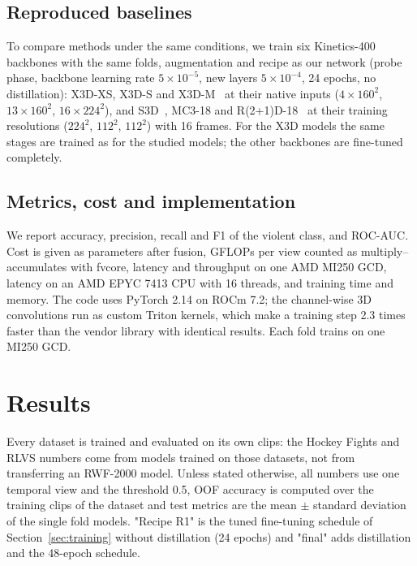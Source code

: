 \documentclass[conference]{IEEEtran}
\begin{document}
\subsection{Reproduced baselines}

To compare methods under the same conditions, we train six Kinetics-400
backbones with the same folds, augmentation and recipe as our network
(probe phase, backbone learning rate $5\times10^{-5}$, new layers
$5\times10^{-4}$, 24 epochs, no distillation): X3D-XS, X3D-S and
X3D-M~\cite{x3d} at their native inputs ($4\times160^2$, $13\times160^2$,
$16\times224^2$), and S3D~\cite{s3d}, MC3-18 and
R(2+1)D-18~\cite{r2plus1d} at their training resolutions ($224^2$,
$112^2$, $112^2$) with 16 frames. For the X3D models the same stages are trained as for the studied models; the
other backbones are fine-tuned completely.

\subsection{Metrics, cost and implementation}

We report accuracy, precision, recall and F1 of the violent class, and
ROC-AUC. Cost is given as parameters after fusion, GFLOPs per view counted
as multiply--accumulates with fvcore, latency and throughput on one AMD
MI250 GCD, latency on an AMD EPYC 7413 CPU with 16 threads, and training
time and memory. The code uses PyTorch 2.14 on ROCm 7.2; the channel-wise
3D convolutions run as custom Triton kernels, which make a training step
2.3 times faster than the vendor library with identical results. Each fold
trains on one MI250 GCD.

\section{Results}
\label{sec:results}

Every dataset is trained and evaluated on its own clips: the Hockey
Fights and RLVS numbers come from models trained on those datasets, not
from transferring an RWF-2000 model. Unless stated otherwise, all numbers
use one temporal view and the threshold 0.5, OOF accuracy is computed over the training clips of the
dataset and test metrics are the mean $\pm$ standard deviation of the
single fold models. "Recipe R1" is the tuned fine-tuning schedule of
Section~\ref{sec:training} without distillation (24 epochs) and "final"
adds distillation and the 48-epoch schedule.
\end{document}
